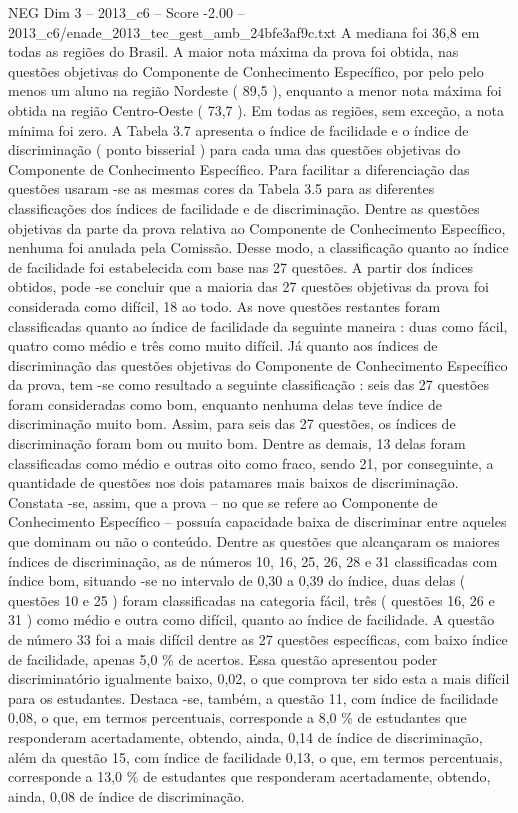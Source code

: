 \begin{textsample}{NEG Dim 3 – 2013\_c6 – Score -2.00 – 2013\_c6/enade\_2013\_tec\_gest\_amb\_24bfe3af9c.txt}
A mediana foi 36,8 em todas as regiões do Brasil.
A maior nota máxima da prova foi obtida, nas questões objetivas do Componente de Conhecimento Específico, por pelo pelo menos um aluno na região Nordeste ( 89,5 ), enquanto a menor nota máxima foi obtida na região Centro-Oeste ( 73,7 ).
Em todas as regiões, sem exceção, a nota mínima foi zero.
A Tabela 3.7 apresenta o índice de facilidade e o índice de discriminação ( ponto bisserial ) para cada uma das questões objetivas do Componente de Conhecimento Específico.
Para facilitar a diferenciação das questões usaram -se as mesmas cores da Tabela 3.5 para as diferentes classificações dos índices de facilidade e de discriminação.
Dentre as questões objetivas da parte da prova relativa ao Componente de Conhecimento Específico, nenhuma foi anulada pela Comissão.
Desse modo, a classificação quanto ao índice de facilidade foi estabelecida com base nas 27 questões.
A partir dos índices obtidos, pode -se concluir que a maioria das 27 questões objetivas da prova foi considerada como difícil, 18 ao todo.
As nove questões restantes foram classificadas quanto ao índice de facilidade da seguinte maneira : duas como fácil, quatro como médio e três como muito difícil.
Já quanto aos índices de discriminação das questões objetivas do Componente de Conhecimento Específico da prova, tem -se como resultado a seguinte classificação : seis das 27 questões foram consideradas como bom, enquanto nenhuma delas teve índice de discriminação muito bom.
Assim, para seis das 27 questões, os índices de discriminação foram bom ou muito bom.
Dentre as demais, 13 delas foram classificadas como médio e outras oito como fraco, sendo 21, por conseguinte, a quantidade de questões nos dois patamares mais baixos de discriminação.
Constata -se, assim, que a prova – no que se refere ao Componente de Conhecimento Específico – possuía capacidade baixa de discriminar entre aqueles que dominam ou não o conteúdo.
Dentre as questões que alcançaram os maiores índices de discriminação, as de números 10, 16, 25, 26, 28 e 31 classificadas com índice bom, situando -se no intervalo de 0,30 a 0,39 do índice, duas delas ( questões 10 e 25 ) foram classificadas na categoria fácil, três ( questões 16, 26 e 31 ) como médio e outra como difícil, quanto ao índice de facilidade.
A questão de número 33 foi a mais difícil dentre as 27 questões específicas, com baixo índice de facilidade, apenas 5,0 \% de acertos.
Essa questão apresentou poder discriminatório igualmente baixo, 0,02, o que comprova ter sido esta a mais difícil para os estudantes.
Destaca -se, também, a questão 11, com índice de facilidade 0,08, o que, em termos percentuais, corresponde a 8,0 \% de estudantes que responderam acertadamente, obtendo, ainda, 0,14 de índice de discriminação, além da questão 15, com índice de facilidade 0,13, o que, em termos percentuais, corresponde a 13,0 \% de estudantes que responderam acertadamente, obtendo, ainda, 0,08 de índice de discriminação.

\end{textsample}
